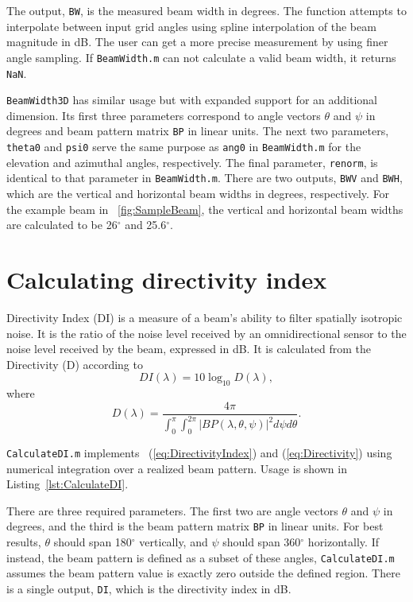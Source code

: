 The output, \texttt{BW}, is the measured beam width in degrees. The function attempts to interpolate between input grid angles using spline interpolation of the beam magnitude in dB. The user can get a more precise measurement by using finer angle sampling. If \texttt{BeamWidth.m} can not calculate a valid beam width, it returns \texttt{NaN}.

\texttt{BeamWidth3D} has similar usage but with expanded support for an additional dimension. Its first three parameters correspond to angle vectors $\theta$ and $\psi$ in degrees and beam pattern matrix \texttt{BP} in linear units. The next two parameters, \texttt{theta0} and \texttt{psi0} serve the same purpose as \texttt{ang0} in \texttt{BeamWidth.m} for the elevation and azimuthal angles, respectively. The final parameter, \texttt{renorm}, is identical to that parameter in \texttt{BeamWidth.m}. There are two outputs, \texttt{BWV} and \texttt{BWH}, which are the vertical and horizontal beam widths in degrees, respectively. For the example beam in \figname~\ref{fig:SampleBeam}, the vertical and horizontal beam widths are calculated to be 26$^\circ$ and 25.6$^\circ$.

\section{Calculating directivity index}

Directivity Index (DI) is a measure of a beam's ability to filter spatially isotropic noise. It is the ratio of the noise level received by an omnidirectional sensor to the noise level received by the beam, expressed in dB. It is calculated from the Directivity (D) according to
\begin{equation}
DI(\lambda) = 10\log_{10}D(\lambda),\label{eq:DirectivityIndex}
\end{equation}
where
\begin{equation}
D(\lambda) = \frac{4\pi}{\int_0^{\pi}\int_0^{2\pi}|BP(\lambda,\theta,\psi)|^2d\psi{d\theta}}.\label{eq:Directivity}
\end{equation}

\texttt{CalculateDI.m} implements \eqnnames~(\ref{eq:DirectivityIndex}) and (\ref{eq:Directivity}) using numerical integration over a realized beam pattern. Usage is shown in Listing~\ref{lst:CalculateDI}.

There are three required parameters. The first two are angle vectors $\theta$ and $\psi$ in degrees, and the third is the beam pattern matrix \texttt{BP} in linear units. For best results, $\theta$ should span 180$^\circ$ vertically, and $\psi$ should span 360$^\circ$ horizontally. If instead, the beam pattern is defined as a subset of these angles, \texttt{CalculateDI.m} assumes the beam pattern value is exactly zero outside the defined region. There is a single output, \texttt{DI}, which is the directivity index in dB.

